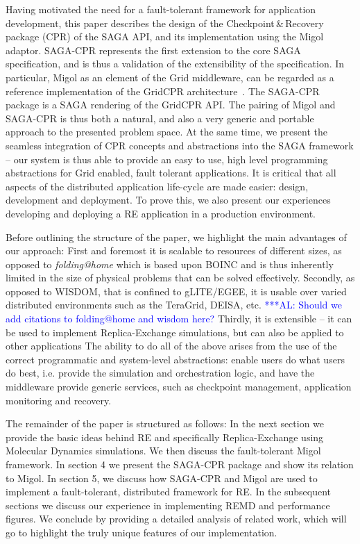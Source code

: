 \documentclass[times, 10pt, twocolumn]{article}
\newcommand{\alnote}[1]{ {\textcolor{blue} { ***AL: #1 }}}
\newcommand{\jhanote}[1]{ {\textcolor{red} { ***SJ: #1 }}}
\newcommand{\alnote}[1]{}
\newcommand{\jhanote}[1]{}
\begin{document}
Having motivated the need for a fault-tolerant framework for
application development, this paper describes the design of the
Checkpoint\,\&\,Recovery package (CPR) of the SAGA API, and its
implementation using the Migol adaptor. SAGA-CPR represents the first
extension to the core SAGA specification, and is thus a validation of
the extensibility of the specification.  In particular, Migol as an
element of the Grid middleware, can be regarded as a reference
implementation of the GridCPR architecture~\cite{ogf_cpr_arch}.  
The SAGA-CPR package is a SAGA rendering of
the GridCPR API.%
The pairing of Migol and SAGA-CPR is thus both a natural, and also a
very generic and portable approach to the presented problem space.  At
the same time, we present the seamless integration of CPR concepts and
abstractions into the SAGA framework -- our system is thus able to
provide an easy to use, high level programming abstractions for Grid
enabled, fault tolerant applications.  It is critical that all aspects
of the distributed application life-cycle are made easier: design,
development and deployment. To prove this, we also present our
experiences developing and deploying a RE application in a production
environment.

Before outlining the structure of the paper, we highlight the main
advantages of our approach: First and foremost it is scalable to
resources of different sizes, as opposed to {\it folding@home}
which is based upon BOINC and is thus inherently limited in the size of
physical problems that can be solved effectively. Secondly, as opposed
to WISDOM, that is confined to gLITE/EGEE, it is usable over varied
distributed environments such as the TeraGrid, DEISA, etc.
\alnote{Should we add citations to folding@home and wisdom here?} 
Thirdly, it is extensible -- it can be used to implement Replica-Exchange simulations, 
but can also be applied to other applications
The ability to do all of the above arises from the use of the
correct programmatic and system-level abstractions: enable users do
what users do best,%
i.e. provide the simulation and orchestration logic, and 
have the middleware provide generic services,
such as checkpoint management, application monitoring and recovery.

The remainder of the paper is structured as follows: In the next
section we provide the basic ideas behind RE and specifically
Replica-Exchange using Molecular Dynamics simulations.  We then
discuss the fault-tolerant Migol framework. In section 4 we present
the SAGA-CPR package and show its relation to Migol. In section 5, we
discuss how SAGA-CPR and Migol are used to implement a fault-tolerant,
distributed framework for RE. In the subsequent sections we discuss
our experience in implementing REMD and performance figures. We
conclude by providing a detailed analysis of related work, which will
go to highlight the truly unique features of our implementation.
\end{document}
